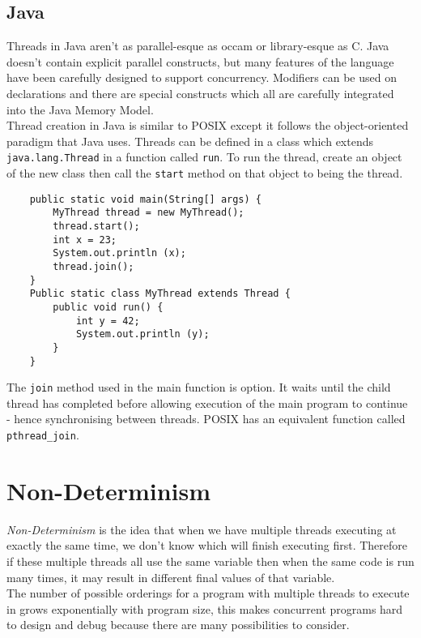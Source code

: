 \subsection{Java}
Threads in Java aren't as parallel-esque as occam or library-esque as C. Java doesn't contain explicit parallel constructs, but many features of the language have been carefully designed to support concurrency. Modifiers can be used on declarations and there are special constructs which all are carefully integrated into the Java Memory Model.\\

Thread creation in Java is similar to POSIX except it follows the object-oriented paradigm that Java uses. Threads can be defined in a class which extends \verb|java.lang.Thread| in a function called \verb|run|. To run the thread, create an object of the new class then call the \verb|start| method on that object to being the thread.

\begin{verbatim}
    public static void main(String[] args) {
        MyThread thread = new MyThread();
        thread.start();
        int x = 23;
        System.out.println (x);
        thread.join();
    }
    Public static class MyThread extends Thread {
        public void run() {
            int y = 42;
            System.out.println (y);
        }
    }
\end{verbatim}

The \verb|join| method used in the main function is option. It waits until the child thread has completed before allowing execution of the main program to continue - hence synchronising between threads. POSIX has an equivalent function called \verb|pthread_join|.

\section{Non-Determinism}
\textit{Non-Determinism} is the idea that when we have multiple threads executing at exactly the same time, we don't know which will finish executing first. Therefore if these multiple threads all use the same variable then when the same code is run many times, it may result in different final values of that variable.\\

The number of possible orderings for a program with multiple threads to execute in grows exponentially with program size, this makes concurrent programs hard to design and debug because there are many possibilities to consider.\\

